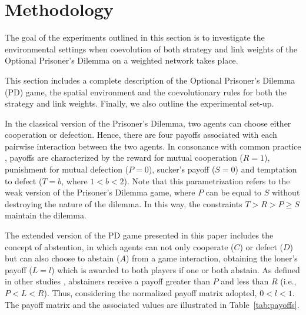 \documentclass{llncs}
\begin{document}
\section{Methodology}
\label{sec:methodology}

The goal of the experiments outlined in this section is to investigate the
environmental settings when coevolution of both strategy and link weights of
the Optional Prisoner's Dilemma on a weighted network takes place.

This section includes a complete description of the Optional Prisoner's
Dilemma (PD) game, the spatial environment and the coevolutionary rules for
both the strategy and link weights. Finally, we also outline the experimental
set-up.

In the classical version of the Prisoner's Dilemma, two agents can choose
either cooperation or defection. Hence, there are four payoffs associated with
each pairwise interaction between the two agents. In consonance with common
practice \cite{Huang2015,Nowak1992}, payoffs are characterized by the reward
for mutual cooperation ($R=1$), punishment for mutual defection ($P=0$),
sucker's payoff ($S=0$) and temptation to defect ($T=b$, where $1<b<2$).
Note that this parametrization refers to the weak version of the Prisoner's
Dilemma game, where $P$ can be equal to $S$ without destroying the nature of
the dilemma. In this way, the constraints $T > R > P \ge S$ maintain the dilemma.

The extended version of the PD game presented in this paper includes the
concept of abstention, in which agents can not only cooperate ($C$) or defect
($D$) but can also choose to abstain ($A$) from a game interaction, obtaining
the loner's payoff ($L=l$) which is awarded to both players if one or both
abstain. As defined in other studies \cite{Cardinot2016sab,Hauert2002},
abstainers receive a payoff greater than $P$ and less than $R$ (i.e., $P<L<R$).
Thus, considering the normalized payoff matrix adopted, $0<l<1$. The payoff
matrix and the associated values are illustrated in Table~\ref{tab:payoffs}.
\end{document}
